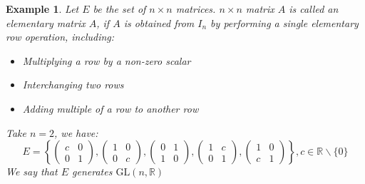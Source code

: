 \documentclass{article}
\theoremstyle{MyNonumberplain}
\theoremstyle{break}
\newcommand{\tmop}{\text}
\theoremstyle{break}
\newtheorem{example}{Example}[section]
\theoremstyle{break}
\theoremstyle{definition}
\theoremstyle{break}
\begin{document}
\begin{expbox}
    \begin{example}
        Let $E$ be the set of $n \times n$ matrices. $n \times n$ matrix $A$ is called
        an elementary matrix $A$, if $A$ is obtained from $I_n$ by performing a single
        elementary row operation, including:\\

        \begin{itemize}
        \item Multiplying a row by a non-zero scalar\\
        
        \item Interchanging two rows\\
        
        \item Adding multiple of a row to another row\\
        \end{itemize}
        Take $n = 2$, we have:
        \[ E = \left\{ \left(\begin{array}{cc}
            c & 0\\
            0 & 1
        \end{array}\right), \left(\begin{array}{cc}
            1 & 0\\
            0 & c
        \end{array}\right), \left(\begin{array}{cc}
            0 & 1\\
            1 & 0
        \end{array}\right), \left(\begin{array}{cc}
            1 & c\\
            0 & 1
        \end{array}\right), \left(\begin{array}{cc}
            1 & 0\\
            c & 1
        \end{array}\right) \right\}, c \in \mathbb{R}\backslash \{ 0 \} \]
        We say that $E$ generates $\tmop{GL} (n, \mathbb{R})$
    \end{example}
\end{expbox}
\end{document}
